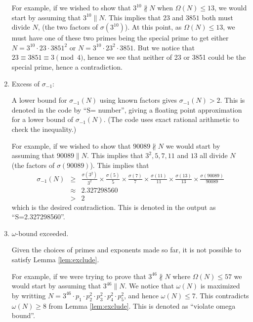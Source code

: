 \documentclass{article}
\newcommand{\sii} {\sigma_{-1}}
\begin{document}
\begin{enumerate}
    For example, if we wished to show that $3^{10} \nparallel N$ when
         $\Omega(N) \leq 13$, we would start by assuming that
         $3^{10} \parallel N$.
    This implies that $23$ and $3851$ both must divide $N$, (the 
         two factors of $\sigma(3^{10})$).
    At this point, as $\Omega(N) \leq 13$, we must have one of these
        two primes being the special prime to get either 
        $N = 3^{10} \cdot 23 \cdot 3851^2$ or 
        $N = 3^{10} \cdot 23^2 \cdot 3851$.
    But we notice that $23 \equiv 3851 \equiv 3 \pmod{4}$, hence 
        we see that neither of 23 or 3851 could be the special prime, 
        hence a contradiction. 

\item Excess of $\sii$:  

    A lower bound for $\sii(N)$ using known factors gives
    $\sii(N) > 2$.
    This is denoted in the code by ``S= number'', giving a floating 
        point approximation for a lower bound of $\sii(N)$.
    (The code uses exact rational arithmetic to check the inequality.)

    For example, if we wished to show that $90089 \nparallel N$ we would
        start by assuming that $90089 \parallel N$.
    This implies that $3^2, 5, 7, 11$ and $13$ all divide $N$
        (the factors of $\sigma(90089)$).
    This implies that 
        \begin{eqnarray*}
      \sii(N) &\geq & \frac{\sigma(3^2)}{3^2}\times
                         \frac{\sigma(5)}{5}\times
                         \frac{\sigma(7)}{7}\times
                         \frac{\sigma(11)}{11}\times
                         \frac{\sigma(13)}{13}\times
                         \frac{\sigma(90089)}{90089} \\
                  & \approx& 2.327298560 \\ &>& 2 
        \end{eqnarray*}
        which is the desired contradiction.
    This is denoted in the output as ``S=2.327298560''.

\item $\omega$-bound exceeded. \label{cont:omega}

    Given the choices of primes and exponents made so far, it is not
        possible to satisfy Lemma \ref{lem:exclude}.

    For example, if we were trying to prove that $3^{46}\nparallel N$ where 
        $\Omega(N) \leq 57$ we would start by assuming that 
        $3^{46} \parallel N$.
    We notice that $\omega(N)$ is maximized by writting 
        $N = 3^{46}\cdot p_1 \cdot p_2^2 \cdot p_3^2
                   \cdot p_4^2\cdot p_5^2$, and hence
        $\omega(N) \leq 7$.
    This contradicts $\omega(N) \geq 8$ from Lemma \ref{lem:exclude}.
    This is denoted as ``violate omega bound''.
\end{enumerate}
\end{document}

